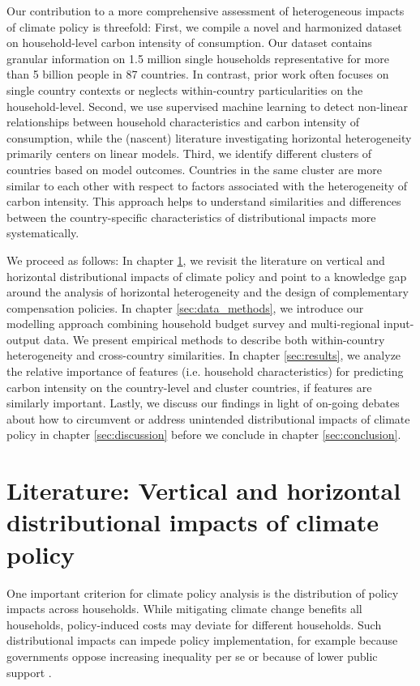 \documentclass[12pt, a4paper]{article}
\begin{document}
Our contribution to a more comprehensive assessment of heterogeneous impacts of climate policy is threefold: First, we compile a novel and harmonized dataset on household-level carbon intensity of consumption. Our dataset contains granular information on 1.5 million single households representative for more than 5 billion people in 87 countries. In contrast, prior work often focuses on single country contexts or neglects within-country particularities on the household-level. Second, we use supervised machine learning to detect non-linear relationships between household characteristics and carbon intensity of consumption, while the (nascent) literature investigating horizontal heterogeneity primarily centers on linear models. Third, we identify different clusters of countries based on model outcomes. Countries in the same cluster are more similar to each other with respect to factors associated with the heterogeneity of carbon intensity. This approach helps to understand similarities and differences between the country-specific characteristics of distributional impacts more systematically. %

We proceed as follows: In chapter \ref{sec:literature}, we revisit the literature on vertical and horizontal distributional impacts of climate policy and point to a knowledge gap around the analysis of horizontal heterogeneity and the design of complementary compensation policies. In chapter \ref{sec:data_methods}, we introduce our modelling approach combining household budget survey and multi-regional input-output data. We present empirical methods to describe both within-country heterogeneity and cross-country similarities. In chapter \ref{sec:results}, we analyze the relative importance of features (i.e. household characteristics) for predicting carbon intensity on the country-level and cluster countries, if features are similarly important. Lastly, we discuss our findings in light of on-going debates about how to circumvent or address unintended distributional impacts of climate policy in chapter \ref{sec:discussion} before we conclude in chapter \ref{sec:conclusion}.  

\section{Literature: Vertical and horizontal distributional impacts of climate policy} \label{sec:literature}

One important criterion for climate policy analysis is the distribution of policy impacts across households. While mitigating climate change benefits all households, policy-induced costs may deviate for different households. Such distributional impacts can impede policy implementation, for example because governments oppose increasing inequality per se or because of lower public support \autocite{Bergquist.2022,Douenne.2022}. 
\end{document}
